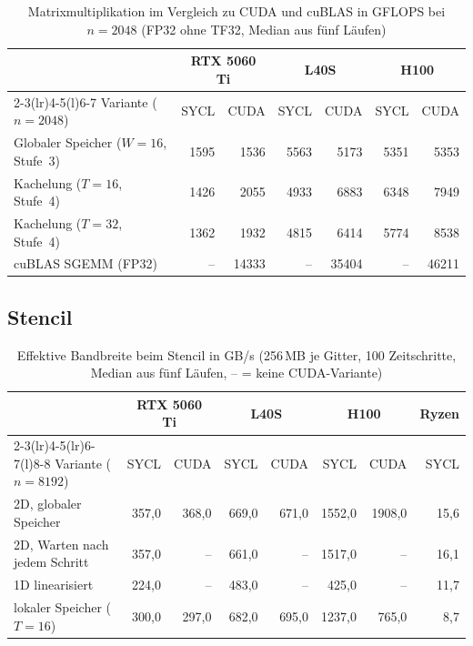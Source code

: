 \documentclass[12pt,a4paper]{article}
\begin{document}
\begin{table}[H]
\centering
\footnotesize
\setlength{\tabcolsep}{4pt}
\caption[Matrixmultiplikation im Vergleich zu CUDA und cuBLAS]{Matrixmultiplikation im Vergleich zu CUDA und cuBLAS in GFLOPS bei $n = 2048$ (FP32 ohne TF32, Median aus fünf Läufen)}
\label{tab:matmul_cuda}
\begin{tabular}{@{}l*{6}{r}@{}}
\toprule
 & \multicolumn{2}{c}{RTX 5060 Ti} & \multicolumn{2}{c}{L40S} & \multicolumn{2}{c}{H100} \\
\cmidrule(lr){2-3}\cmidrule(lr){4-5}\cmidrule(l){6-7}
Variante ($n = 2048$) & SYCL & CUDA & SYCL & CUDA & SYCL & CUDA \\
\midrule
Globaler Speicher ($W = 16$, Stufe~3) & 1595 & 1536  & 5563 & 5173  & 5351 & 5353  \\
Kachelung ($T = 16$, Stufe~4)         & 1426 & 2055  & 4933 & 6883  & 6348 & 7949  \\
Kachelung ($T = 32$, Stufe~4)         & 1362 & 1932  & 4815 & 6414  & 5774 & 8538  \\
cuBLAS SGEMM (FP32)                   & --   & 14333 & --   & 35404 & --   & 46211 \\
\bottomrule
\end{tabular}
\end{table}

\subsection{Stencil}\label{sec:a-stencil}

\begin{table}[H]
\centering
\footnotesize
\setlength{\tabcolsep}{4pt}
\caption[Effektive Bandbreite beim Stencil (GB/s)]{Effektive Bandbreite beim Stencil in GB/s (256\,MB je Gitter, 100 Zeitschritte, Median aus fünf Läufen, -- = keine CUDA-Variante)}
\label{tab:stencil}
\begin{tabular}{@{}l*{7}{r}@{}}
\toprule
 & \multicolumn{2}{c}{RTX 5060 Ti} & \multicolumn{2}{c}{L40S} & \multicolumn{2}{c}{H100} & Ryzen \\
\cmidrule(lr){2-3}\cmidrule(lr){4-5}\cmidrule(lr){6-7}\cmidrule(l){8-8}
Variante ($n = 8192$) & SYCL & CUDA & SYCL & CUDA & SYCL & CUDA & SYCL \\
\midrule
2D, globaler Speicher          &  357,0 &  368,0 &  669,0 &  671,0 & 1552,0 & 1908,0 & 15,6 \\
2D, Warten nach jedem Schritt  &  357,0 &     -- &  661,0 &     -- & 1517,0 &     -- & 16,1 \\
1D linearisiert                &  224,0 &     -- &  483,0 &     -- &  425,0 &     -- & 11,7 \\
lokaler Speicher ($T = 16$)    &  300,0 &  297,0 &  682,0 &  695,0 & 1237,0 &  765,0 &  8,7 \\
\bottomrule
\end{tabular}
\end{table}
\end{document}
